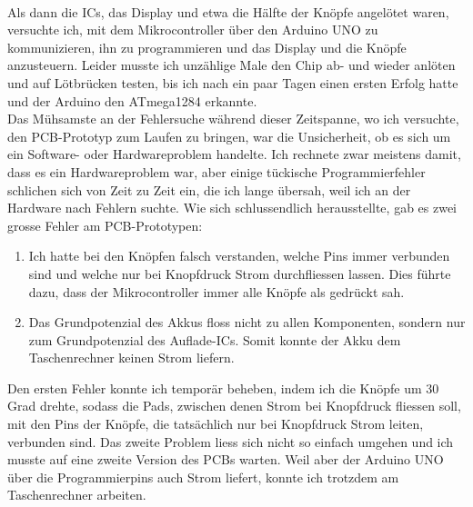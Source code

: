 \documentclass[12pt, a4paper]{report}
\begin{document}
\\[\medskipamount]
Als dann die ICs, das Display und etwa die Hälfte der Knöpfe angelötet waren, versuchte ich, mit dem Mikrocontroller über den Arduino UNO zu kommunizieren, ihn zu programmieren und das Display und die Knöpfe anzusteuern. Leider musste ich unzählige Male den Chip ab- und wieder anlöten und auf Lötbrücken testen, bis ich nach ein paar Tagen einen ersten Erfolg hatte und der Arduino den ATmega1284 erkannte.
\\[\medskipamount]
Das Mühsamste an der Fehlersuche während dieser Zeitspanne, wo ich versuchte, den PCB-Prototyp zum Laufen zu bringen, war die Unsicherheit, ob es sich um ein Software- oder Hardwareproblem handelte. Ich rechnete zwar meistens damit, dass es ein Hardwareproblem war, aber einige tückische Programmierfehler schlichen sich von Zeit zu Zeit ein, die ich lange übersah, weil ich an der Hardware nach Fehlern suchte. Wie sich schlussendlich herausstellte, gab es zwei grosse Fehler am PCB-Prototypen:
\begin{enumerate}
	\item Ich hatte bei den Knöpfen falsch verstanden, welche Pins immer verbunden sind und welche nur bei Knopfdruck Strom durchfliessen lassen. Dies führte dazu, dass der Mikrocontroller immer alle Knöpfe als gedrückt sah.
	\item Das Grundpotenzial des Akkus floss nicht zu allen Komponenten, sondern nur zum Grundpotenzial des Auflade-ICs. Somit konnte der Akku dem Taschenrechner keinen Strom liefern.
\end{enumerate}
Den ersten Fehler konnte ich temporär beheben, indem ich die Knöpfe um 30 Grad drehte, sodass die Pads, zwischen denen Strom bei Knopfdruck fliessen soll, mit den Pins der Knöpfe, die tatsächlich nur bei Knopfdruck Strom leiten, verbunden sind.
Das zweite Problem liess sich nicht so einfach umgehen und ich musste auf eine zweite Version des PCBs warten. Weil aber der Arduino UNO über die Programmierpins auch Strom liefert, konnte ich trotzdem am Taschenrechner arbeiten.
\end{document}
